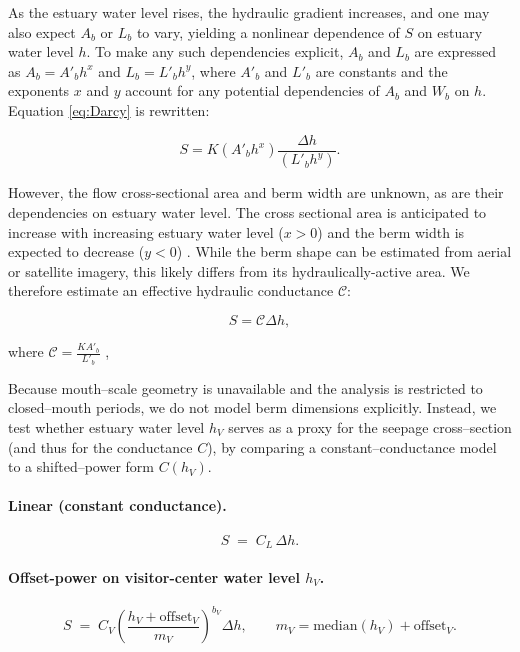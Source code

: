 \documentclass[preprint,12pt,authoryear]{elsarticle}
\begin{document}
As the estuary water level rises, the hydraulic gradient increases, and one may also expect $A_b$ or $L_b$ to vary, yielding a nonlinear dependence of $S$ on estuary water level  $ h$. To make any such dependencies explicit, $A_b$ and $L_b$ are expressed as $A_b = A'_b  h^x$ and $L_b = L'_b  h^y$, where $A'_b$ and $L'_b$ are constants and the exponents $x$ and $y$ account for any potential dependencies of $A_b$ and $W_b$ on $ h$. 
Equation \ref{eq:Darcy} is rewritten:

\begin{equation}
    S = K (A'_b  h^x) \frac{\Delta h}{ (L'_b  h^y)}.
    \label{eq:Darcy_w_exponents}
\end{equation}

However, the flow cross-sectional area and berm width are unknown, as are their dependencies on estuary water level. The cross sectional area is anticipated to increase with increasing estuary water level ($x >0$) and the berm width is expected to decrease ($y < 0$) .  While the berm shape can be estimated from aerial or satellite imagery, this likely differs from its hydraulically-active area. We therefore estimate an effective hydraulic conductance $\mathcal{C}$:

\begin{equation}
    S =\mathcal{C} \Delta h,
    \label{eq:tildeK}
\end{equation}

 \noindent where $\mathcal{C} =  \frac{K A'_b}{ L'_b}$ ,

 Because mouth--scale geometry is unavailable and the analysis is restricted to closed--mouth periods, we do not model berm dimensions explicitly. Instead, we test whether estuary water level $h_V$ serves as a proxy for the {seepage cross--section} (and thus for the conductance $C$), by comparing a constant--conductance model to a shifted--power form $C(h_V)$.



\paragraph{Linear (constant conductance).}
\[
S \;=\; C_L\,\Delta h.
\]

\paragraph{Offset-power on visitor-center water level $h_V$.}
\[
S \;=\; C_V\left(\frac{h_V+\mathrm{offset}_V}{m_V}\right)^{b_V}\Delta h,
\qquad
m_V=\mathrm{median}(h_V)+\mathrm{offset}_V.
\]
\end{document}

